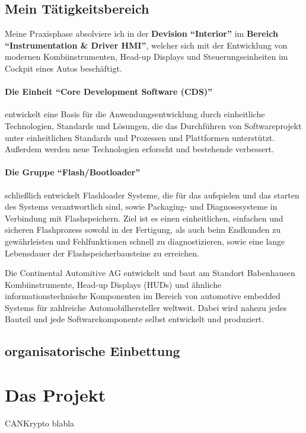 \subsection{Mein Tätigkeitsbereich}
Meine Praxisphase absolviere ich in der \textbf{Devision "`Interior"'} im \textbf{Bereich "`Instrumentation \& Driver HMI"'}, welcher sich mit der Entwicklung von modernen Kombiinstrumenten, Head-up Displays und Steuerungseinheiten im Cockpit eines Autos beschäftigt.
\paragraph{Die Einheit "`Core Development Software (CDS)"'} entwickelt eine Basis für die Anwendungsentwicklung durch einheitliche Technologien, Standards und Lösungen, die das Durchführen von Softwareprojekt unter einheitlichen Standards und Prozessen und Plattformen unterstützt. Außerdem werden neue Technologien erforscht und bestehende verbessert.  
\paragraph{Die Gruppe "`Flash/Bootloader"'} schließlich entwickelt Flashloader Systeme, die für das aufspielen und das starten des Systems verantwortlich sind, sowie Packaging- und Diagnosesysteme in Verbindung mit Flashspeichern. Ziel ist es einen einheitlichen, einfachen und sicheren Flashprozess sowohl in der Fertigung, als auch beim Endkunden zu gewährleisten und Fehlfunktionen schnell zu diagnostizieren, sowie eine lange Lebensdauer der Flashspeicherbausteine zu erreichen.








Die Continental Automitive AG entwickelt und baut am Standort Babenhausen Kombiinstrumente, Head-up Displays (HUDs) und ähnliche informationstechnische Komponenten im Bereich von automotive embedded Systems für zahlreiche Automobilhersteller weltweit. Dabei wird nahezu jedes Bauteil und jede Softwarekomponente  selbst entwickelt und produziert. 

\subsection{organisatorische Einbettung} %
\section{Das Projekt}
CANKrypto blabla

